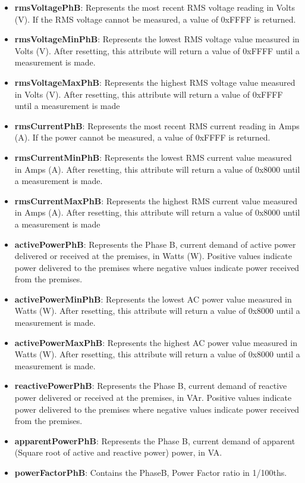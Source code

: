 \begin{itemize}
\item \textbf{rmsVoltagePhB}: Represents the most recent RMS voltage reading in Volts (V). If the RMS voltage cannot be measured, a value of 0xFFFF is returned.
\item \textbf{rmsVoltageMinPhB}: Represents the lowest RMS voltage value measured in Volts (V). After resetting, this attribute will return a value of 0xFFFF until a measurement is made.
\item \textbf{rmsVoltageMaxPhB}: Represents the highest RMS voltage value measured in Volts (V). After resetting, this attribute will return a value of 0xFFFF until a measurement is made
\item \textbf{rmsCurrentPhB}: Represents the most recent RMS current reading in Amps (A). If the power cannot be measured, a value of 0xFFFF is returned.
\item \textbf{rmsCurrentMinPhB}: Represents the lowest RMS current value measured in Amps (A). After resetting, this attribute will return a value of 0x8000 until a measurement is made.
\item \textbf{rmsCurrentMaxPhB}: Represents the highest RMS current value measured in Amps (A). After resetting, this attribute will return a value of 0x8000 until a measurement is made
\item \textbf{activePowerPhB}: Represents the Phase B, current demand of active power delivered or received at the premises, in Watts (W). Positive values indicate power delivered to the premises where negative values indicate power received from the premises.
\item \textbf{activePowerMinPhB}: Represents the lowest AC power value measured in Watts (W). After resetting, this attribute will return a value of 0x8000 until a measurement is made.
\item \textbf{activePowerMaxPhB}: Represents the highest AC power value measured in Watts (W). After resetting, this attribute will return a value of 0x8000 until a measurement is made.
\item \textbf{reactivePowerPhB}: Represents the Phase B, current demand of reactive power delivered or received at the premises, in VAr. Positive values indicate power delivered to the premises where negative values indicate power received from the premises.
\item \textbf{apparentPowerPhB}: Represents the Phase B, current demand of apparent (Square root of active and reactive power) power, in VA.
\item \textbf{powerFactorPhB}: Contains the PhaseB, Power Factor ratio in 1/100ths.

\end{itemize}
